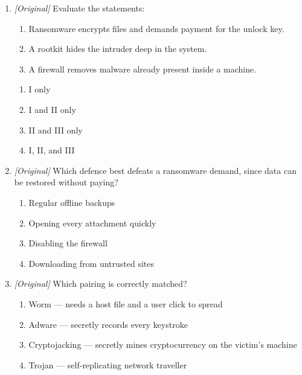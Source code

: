 \begin{enumerate}[label=\textbf{Q\arabic*.}, leftmargin=*]
\begin{enumerate}[label=\Alph*.]
    \item I, II, and III
  \end{enumerate}
\item \textit{[Original]} Evaluate the statements:
  \begin{enumerate}[label=\Roman*.]
    \item Ransomware encrypts files and demands payment for the unlock key.
    \item A rootkit hides the intruder deep in the system.
    \item A firewall removes malware already present inside a machine.
  \end{enumerate}
  \begin{enumerate}[label=\Alph*.]
    \item I only
    \item I and II only
    \item II and III only
    \item I, II, and III
  \end{enumerate}
\item \textit{[Original]} Which defence best defeats a ransomware demand,
  since data can be restored without paying?
  \begin{enumerate}[label=\Alph*.]
    \item Regular offline backups
    \item Opening every attachment quickly
    \item Disabling the firewall
    \item Downloading from untrusted sites
  \end{enumerate}
\item \textit{[Original]} Which pairing is correctly matched?
  \begin{enumerate}[label=\Alph*.]
    \item Worm --- needs a host file and a user click to spread
    \item Adware --- secretly records every keystroke
    \item Cryptojacking --- secretly mines cryptocurrency on the victim's
      machine
    \item Trojan --- self-replicating network traveller
  \end{enumerate}


\end{enumerate}
